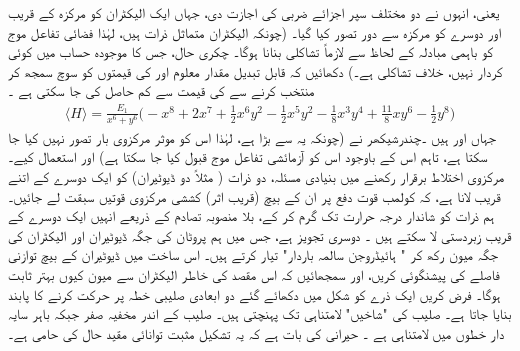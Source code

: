 یعنی،  انہوں نے دو مختلف سپر اجزائے ضربی کی اجازت دی، جہاں  ایک الیکٹران کو مرکزہ کے قریب اور دوسرے کو مرکزہ سے دور تصور کیا گیا۔ (چونکہ الیکٹران متماثل ذرات ہیں،  لہٰذا  فضائی تفاعل موج کو باہمی مبادلہ کے لحاظ سے لازماً تشاکلی بنانا ہوگا۔ چکری حال،  جس کا موجودہ حساب میں کوئی کردار نہیں، خلاف تشاکلی ہے۔) دکھائیں کہ قابل تبدیل مقدار معلوم  اور  کی قیمتوں کو سوچ سمجھ  کر منتخب کرنے سے  کی قیمت  سے کم حاصل کی جا سکتی ہے ۔ 
\begin{align*}
\langle H \rangle = \frac{E_{1}}{x^{6}+y^{6}}\big(-x^{8}+2x^{7}+\frac{1}{2}x^{6}y^{2}-\frac{1}{2}x^{5}y^{2}-\frac{1}{8}x^{3}y^{4}+\frac{11}{8}xy^{6}-\frac{1}{2}y^{8}\big)
\end{align*}
 جہاں  اور  ہیں ۔چندرشیکھر   نے   (چونکہ یہ  سے بڑا ہے، لہٰذا اس کو موثر مرکزوی بار تصور نہیں کیا جا سکتا ہے،  تاہم اس کے باوجود اس کو آزمائشی  تفاعل موج قبول کیا جا سکتا ہے)   اور  استعمال کیے۔
مرکزوی  اختلاط    برقرار رکھنے میں بنیادی مسئلہ،  دو ذرات ( مثلاً دو ڈیوٹیران)  کو ایک دوسرے کے اتنے قریب لانا ہے،   کہ کولمب قوت دفع پر ان کے بیچ  (قریب اثر) کششی    مرکزوی  قوتیں سبقت لے جائیں۔ ہم ذرات کو شاندار درجہ حرارت تک گرم کر کے، بلا منصوبہ  تصادم  کے ذریعے انہیں ایک دوسرے کے قریب زبردستی لا سکتے  ہیں ۔ دوسری تجویز     ہے،  جس میں ہم  پروٹان  کی جگہ ڈیوٹیران اور الیکٹران کی جگہ میون رکھ کر  " ہائیڈروجن سالمہ باردار"   تیار کرتے ہیں۔ اس ساخت میں ڈیوٹیران کے بیچ توازنی فاصلے  کی پیشنگوئی   کریں،    اور  سمجھائیں   کہ اس مقصد کی خاطر  الیکٹران سے میون  کیوں بہتر ثابت ہوگا۔
 
  فرض کریں ایک ذرے کو  شکل  میں دکھائے گئے  دو ابعادی صلیبی  خطہ پر  حرکت کرنے کا پابند بنایا جاتا ہے۔ صلیب کی "شاخیں"    لامتناہی تک پہنچتی  ہیں۔  صلیب کے اندر مخفیہ صفر   جبکہ  باہر سایہ دار خطوں میں لامتناہی ہے ۔ حیرانی کی بات ہے کہ یہ تشکیل مثبت توانائی مقید حال کی حامی ہے۔

